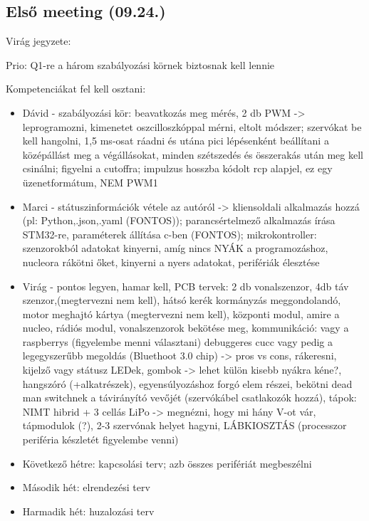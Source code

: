 \documentclass{article}
\begin{document}
\subsection{Első meeting (09.24.)}

Virág jegyzete:

Prio: Q1-re a három szabályozási körnek biztosnak kell lennie

\vspace{5mm} %

Kompetenciákat fel kell osztani:
\begin{itemize}
\item Dávid - szabályozási kör: beavatkozás meg mérés, 2 db PWM -> leprogramozni, kimenetet oszcilloszkóppal mérni, eltolt módszer; szervókat be kell hangolni, 1,5 ms-osat ráadni és utána pici lépésenként beállítani a középállást meg a végállásokat, minden szétszedés és összerakás után meg kell csinálni; figyelni a cutoffra; impulzus hosszba kódolt rcp alapjel, ez egy üzenetformátum, NEM PWM1
\item Marci - státuszinformációk vétele az autóról -> kliensoldali alkalmazás hozzá (pl: Python,.json,.yaml (FONTOS)); parancsértelmező alkalmazás írása STM32-re, paraméterek állítása c-ben (FONTOS); mikrokontroller: szenzorokból adatokat kinyerni, amíg nincs NYÁK a programozáshoz, nucleora rákötni őket, kinyerni a  nyers adatokat, perifériák élesztése
\item Virág - pontos legyen, hamar kell, PCB tervek: 2 db vonalszenzor, 4db táv szenzor,(megtervezni nem kell), hátsó kerék kormányzás meggondolandó, motor meghajtó kártya (megtervezni nem kell), központi modul, amire a nucleo, rádiós modul, vonalszenzorok bekötése meg, kommunikáció: vagy a raspberrys (figyelembe menni választani) debuggeres cucc vagy pedig a legegyszerűbb megoldás (Bluethoot 3.0 chip) -> pros vs cons, rákeresni, kijelző vagy státusz LEDek, gombok -> lehet külön kisebb nyákra kéne?, hangszóró (+alkatrészek), egyensúlyozáshoz forgó elem részei, bekötni dead man switchnek a távirányító vevőjét (szervókábel csatlakozók hozzá), tápok: NIMT hibrid + 3 cellás LiPo -> megnézni, hogy mi hány V-ot vár, tápmodulok (?), 2-3 szervónak helyet hagyni, LÁBKIOSZTÁS (processzor periféria készletét figyelembe venni)
\item Következő hétre: kapcsolási terv; azb összes perifériát megbeszélni
\item Második hét: elrendezési terv
\item Harmadik hét: huzalozási terv
\end{itemize}
\end{document}
